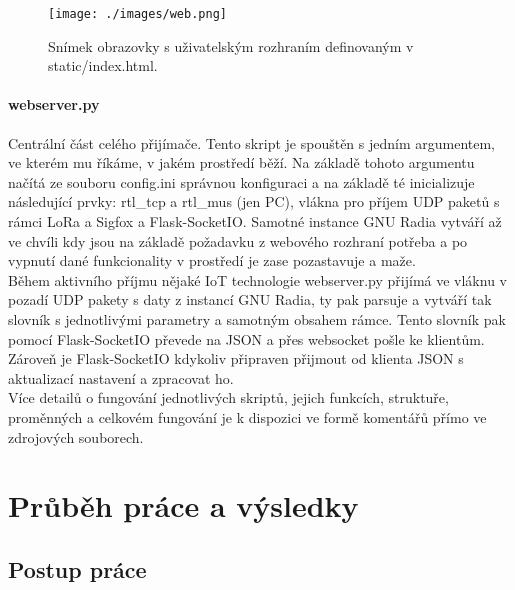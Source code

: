\documentclass{ctuthesis}
\begin{document}
\begin{figure}
	\caption{Snímek obrazovky s uživatelským rozhraním definovaným v static/index.html.}
	\texttt{[image: ./images/web.png]}
	\label{web}
\end{figure}

\subsubsection{webserver.py}
Centrální část celého přijímače. Tento skript je spouštěn s jedním argumentem, ve kterém mu říkáme, v jakém prostředí běží. Na základě tohoto argumentu načítá ze souboru config.ini správnou konfiguraci a na základě té inicializuje následující prvky: rtl\_tcp a rtl\_mus (jen PC), vlákna pro příjem UDP paketů s rámci LoRa a Sigfox a Flask-SocketIO. Samotné instance GNU Radia vytváří až ve chvíli kdy jsou na základě požadavku z webového rozhraní potřeba a po vypnutí dané funkcionality v prostředí je zase pozastavuje a maže.\\
Během aktivního příjmu nějaké IoT technologie webserver.py přijímá ve vláknu v pozadí UDP pakety s daty z instancí GNU Radia, ty pak parsuje a vytváří tak slovník s jednotlivými parametry a samotným obsahem rámce. Tento slovník pak pomocí Flask-SocketIO převede na JSON a přes websocket pošle ke klientům. Zároveň je Flask-SocketIO kdykoliv připraven přijmout od klienta JSON s aktualizací nastavení a zpracovat ho.\\
Více detailů o fungování jednotlivých skriptů, jejich funkcích, struktuře, proměnných a celkovém fungování je k dispozici ve formě komentářů přímo ve zdrojových souborech.




\chapter{Průběh práce a výsledky} \label{results}
\section{Postup práce}
\end{document}
